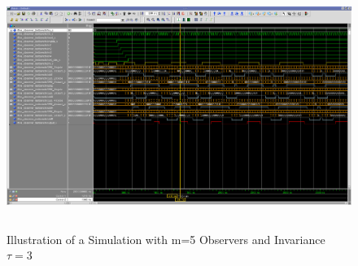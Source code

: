 \begin{figure}[]
\centering
\includegraphics[width=650px,height=300px,angle=-90]{../../pictures/Modelsim/5_Observer_tb_1.png}
\caption[Modelsim Simulation of 5 Observer]{Illustration of a Simulation with m=5 Observers and Invariance $\tau=3$}
\label{fig:simulation:five}
\end{figure}

\newpage
